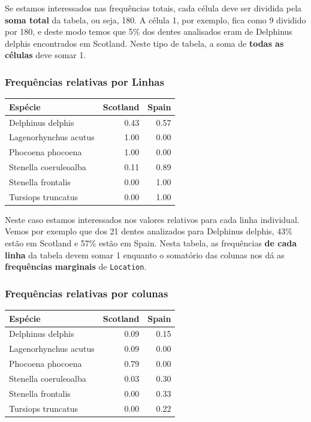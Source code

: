 \documentclass[
]{book}
\begin{document}
Se estamos interessados nas frequências totais, cada célula deve ser dividida pela \textbf{soma total} da tabela, ou seja, 180. A célula 1, por exemplo, fica como 9 dividido por 180, e deste modo temos que 5\% dos dentes analisados eram de Delphinus delphis encontrados em Scotland. Neste tipo de tabela, a soma de \textbf{todas as células} deve somar 1.

\hypertarget{frequuxeancias-relativas-por-linhas}{%
\subsubsection{Frequências relativas por Linhas}\label{frequuxeancias-relativas-por-linhas}}

\begin{tabular}{l|r|r}
\hline
Espécie & Scotland & Spain\\
\hline
Delphinus delphis & 0.43 & 0.57\\
\hline
Lagenorhynchus acutus & 1.00 & 0.00\\
\hline
Phocoena phocoena & 1.00 & 0.00\\
\hline
Stenella coeruleoalba & 0.11 & 0.89\\
\hline
Stenella frontalis & 0.00 & 1.00\\
\hline
Tursiops truncatus & 0.00 & 1.00\\
\hline
\end{tabular}

Neste caso estamos interessados nos valores relativos para cada linha individual. Vemos por exemplo que dos 21 dentes analizados para Delphinus delphis, 43\% estão em Scotland e 57\% estão em Spain. Nesta tabela, as frequências \textbf{de cada linha} da tabela devem somar 1 enquanto o somatório das colunas nos dá as \textbf{frequências marginais} de \texttt{Location}.

\hypertarget{frequuxeancias-relativas-por-colunas}{%
\subsubsection{Frequências relativas por colunas}\label{frequuxeancias-relativas-por-colunas}}

\begin{tabular}{l|r|r}
\hline
Espécie & Scotland & Spain\\
\hline
Delphinus delphis & 0.09 & 0.15\\
\hline
Lagenorhynchus acutus & 0.09 & 0.00\\
\hline
Phocoena phocoena & 0.79 & 0.00\\
\hline
Stenella coeruleoalba & 0.03 & 0.30\\
\hline
Stenella frontalis & 0.00 & 0.33\\
\hline
Tursiops truncatus & 0.00 & 0.22\\
\hline
\end{tabular}
\end{document}
